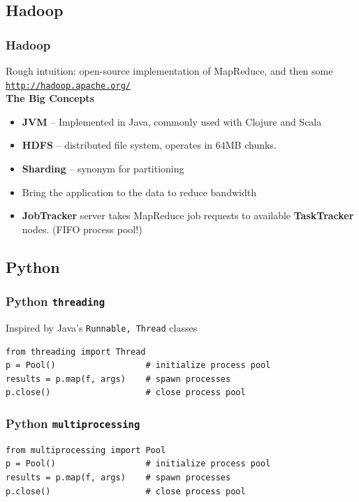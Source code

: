 \documentclass{beamer}
\begin{document}
\subsection{Hadoop}
\begin{frame}
\frametitle{Hadoop}
Rough intuition: open-source implementation of MapReduce, and then some
\texttt{\url{http://hadoop.apache.org/}} \\

\pause
\bigskip
\textbf{The Big Concepts}
\begin{itemize}
  \item \textbf{JVM} -- Implemented in Java, commonly used with Clojure and Scala
  \item \textbf{HDFS} -- distributed file system, operates in 64MB chunks.
  \item \textbf{Sharding} -- synonym for partitioning
  \item Bring the application to the data to reduce bandwidth
  \item \textbf{JobTracker} server takes MapReduce job requests to available \textbf{TaskTracker} nodes. (FIFO process pool!)
\end{itemize}

\end{frame}



\subsection{Python}
\begin{frame}[fragile]
\frametitle{Python \texttt{threading}}
Inspired by Java's \texttt{Runnable, Thread} classes
\begin{verbatim}
from threading import Thread
p = Pool()                  # initialize process pool
results = p.map(f, args)    # spawn processes
p.close()                   # close process pool 
\end{verbatim}
\end{frame}

\begin{frame}[fragile]
\frametitle{Python \texttt{multiprocessing}}
\begin{verbatim}
from multiprocessing import Pool
p = Pool()                  # initialize process pool
results = p.map(f, args)    # spawn processes
p.close()                   # close process pool 
\end{verbatim}
\end{frame}
\end{document}
